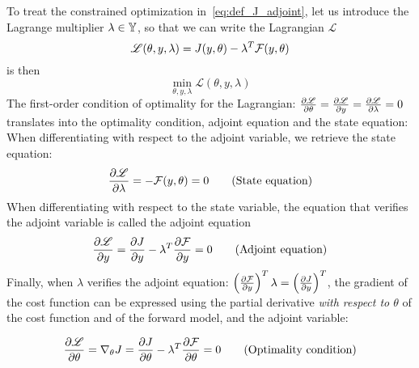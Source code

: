 \documentclass[../../Main_ManuscritThese.tex]{subfiles}
\begin{document}
To treat the constrained optimization in~\cref{eq:def_J_adjoint}, let us introduce the Lagrange multiplier $\lambda \in \mathbb{Y}$, so that we can write the Lagrangian $\mathscr{L}$
\begin{equation}
  \mathscr{L}(\theta, y, \lambda) = J(y,\theta) - \lambda^T \mathcal{F}(y, \theta)
\end{equation}
 is then
\begin{equation}
  \min_{\theta,y,\lambda} \mathscr{L}(\theta,y,\lambda)
\end{equation}
The first-order condition of optimality for the Lagrangian: $\frac{\partial \mathscr{L}}{\partial \theta} = \frac{\partial \mathscr{L}}{\partial y} = \frac{\partial \mathscr{L}}{\partial \lambda} = 0$ translates into the optimality condition, adjoint equation and the state equation:
When differentiating with respect to the adjoint variable, we retrieve the state equation:
\begin{equation}
  \frac{\partial \mathscr{L}}{\partial \lambda} = - \mathcal{F}(y,\theta) = 0 \tag{State equation}
\end{equation}
When differentiating with respect to the state variable, the equation that verifies the adjoint variable is called the adjoint equation
\begin{equation}
  \frac{\partial \mathscr{L}}{\partial y} = \frac{\partial J}{\partial y} - \lambda^T \frac{\partial \mathcal{F}}{\partial y}= 0  \tag{Adjoint equation}
\end{equation}
Finally, when $\lambda$ verifies the adjoint equation: $ \left(\frac{\partial \mathcal{F}}{\partial y}\right)^T\lambda= \left(\frac{\partial J}{\partial y}\right)^T$, the gradient of the cost function can be expressed using the partial derivative \emph{with respect to $\theta$} of the cost function and of the forward model, and the adjoint variable:

\begin{equation}
    \pfrac{\mathscr{L}}{\theta} = \nabla_\theta J %
                               = \pfrac{J}{\theta} - \innerprod{\lambda}{\pfrac{\mathcal{F}}{\theta}} = 0 \tag{Optimality condition}
\end{equation}
\end{document}
